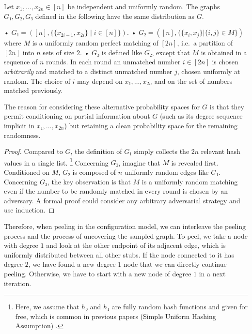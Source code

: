\documentclass[a4paper,USenglish,cleveref]{lipics-v2021}
\begin{document}
\begin{lemma}
  \label{lem:probability-spaces}
  Let $x_1,…,x_{2n} ∈ [n]$ be independent and uniformly random. The graphs $G₁,G₂,G₃$ defined in the following have the same distribution as $G$.
  \begin{enumerate}
    • $G₁ = ([n],\{\{x_{2i-1},x_{2i}\} \mid i ∈ [n]\})$.
    • $G₂ = ([n],\{\{x_i,x_j\} | \{i,j\} ∈ M\})$ where $M$ is a uniformly random perfect matching of $[2n]$, i.e.\ a partition of $[2n]$ into $n$ sets of size $2$.
    • $G₃$ is defined like $G₂$, except that $M$ is obtained in a sequence of $n$ rounds. In each round an unmatched number $i ∈ [2n]$ is chosen \emph{arbitrarily} and matched to a distinct unmatched number $j$, chosen uniformly at random. The choice of $i$ may depend on $x₁,…,x_{2n}$ and on the set of numbers matched previously.
  \end{enumerate}
\end{lemma}
The reason for considering these alternative probability spaces for $G$ is that they permit conditioning on partial information about $G$ (such as its degree sequence implicit in $x₁,…,x_{2n}$) but retaining a clean probability space for the remaining randomness.
\begin{proof}
  Compared to $G$, the definition of $G₁$ simply collects the $2n$ relevant hash values in a single list.%
\footnote{Here, we assume that $h₀$ and $h₁$ are fully random hash functions and given for free, which is common in previous papers (Simple Uniform Hashing Assumption) \cite{dietzfelbinger1990new,pagh2007linear,pagh2008uniform,dietzfelbinger2009applications}.}
  Concerning $G₂$, imagine that $M$ is revealed first. Conditioned on $M$, $G₂$ is composed of $n$ uniformly random edges like $G₁$.
  Concerning $G₃$, the key observation is that $M$ is a uniformly random matching even if the number to be randomly matched in every round is chosen by an adversary. A formal proof could consider any arbitrary adversarial strategy and use induction.
  \hfill
\end{proof}

Therefore, when peeling in the configuration model, we can interleave the peeling process and the process of uncovering the sampled graph.
To peel, we take a node with degree $1$ and look at the other endpoint of its adjacent edge, which is uniformly distributed between all other stubs.
If the node connected to it has degree $2$, we have found a new degree-$1$ node that we can directly continue peeling.
Otherwise, we have to start with a new node of degree $1$ in a next iteration.
\end{document}
